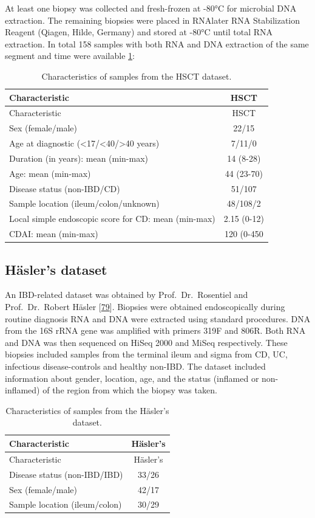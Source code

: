 \documentclass[
  12pt,
  a4paper,
  twoside,
  openright]{book}
\begin{document}
At least one biopsy was collected and fresh-frozen at -80°C for microbial DNA extraction.
The remaining biopsies were placed in RNAlater RNA Stabilization Reagent (Qiagen, Hilde, Germany) and stored at -80°C until total RNA extraction.
In total 158 samples with both RNA and DNA extraction of the same segment and time were available \ref{tab:HSCT}:

\begin{longtable}[]{@{}lc@{}}
\caption{\label{tab:HSCT} Characteristics of samples from the HSCT dataset.}\tabularnewline
\toprule
Characteristic & HSCT \\
\midrule
\endfirsthead
\toprule
Characteristic & HSCT \\
\midrule
\endhead
Sex (female/male) & 22/15 \\
Age at diagnostic (\textless17/\textless40/\textgreater40 years) & 7/11/0 \\
Duration (in years): mean (min-max) & 14 (8-28) \\
Age: mean (min-max) & 44 (23-70) \\
Disease status (non-IBD/CD) & 51/107 \\
Sample location (ileum/colon/unknown) & 48/108/2 \\
Local simple endoscopic score for CD: mean (min-max) & 2.15 (0-12) \\
CDAI: mean (min-max) & 120 (0-450 \\
\bottomrule
\end{longtable}

\hypertarget{methods-hasler}{%
\subsection{Häsler's dataset}\label{methods-hasler}}

An IBD-related dataset was obtained by Prof.~Dr.~Rosentiel and Prof.~Dr.~Robert Häsler {[}\protect\hyperlink{ref-hasler_uncoupling_2016}{79}{]}.
Biopsies were obtained endoscopically during routine diagnosis RNA and DNA were extracted using standard procedures.
DNA from the 16S rRNA gene was amplified with primers 319F and 806R.
Both RNA and DNA was then sequenced on HiSeq 2000 and MiSeq respectively.
These biopsies included samples from the terminal ileum and sigma from CD, UC, infectious disease-controls and healthy non-IBD.
The dataset included information about gender, location, age, and the status (inflamed or non-inflamed) of the region from which the biopsy was taken.

\begin{longtable}[]{@{}lc@{}}
\caption{\label{tab:Hasler} Characteristics of samples from the Häsler's dataset.}\tabularnewline
\toprule
Characteristic & Häsler's \\
\midrule
\endfirsthead
\toprule
Characteristic & Häsler's \\
\midrule
\endhead
Disease status (non-IBD/IBD) & 33/26 \\
Sex (female/male) & 42/17 \\
Sample location (ileum/colon) & 30/29 \\
\bottomrule
\end{longtable}
\end{document}
